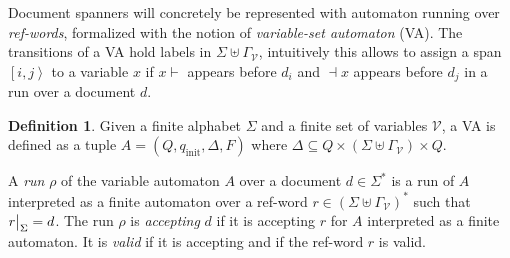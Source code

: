 \documentclass[12px]{article}
\theoremstyle{definition}
\newtheorem{definition}{Definition}
\newcommand{\Span}[1]{\left[ #1 \right\rangle}
\newcommand\restr[2]{{%
  \left.\kern-\nulldelimiterspace %
  #1 %
  \vphantom{\big|} %
  \right|_{#2} %
  }}
\begin{document}

        Document spanners will concretely be represented with automaton running
        over \textit{ref-words}, formalized with the notion of
        \textit{variable-set automaton} (VA). The transitions of a VA hold
        labels in $\Sigma \uplus \Gamma_\mathcal{V}$, intuitively this allows
        to assign a span $\Span{i, j}$ to a variable $x$ if $x{\vdash}$ appears
        before $d_i$ and ${\dashv}x$ appears before $d_j$ in a run over a
        document $d$.

        \begin{definition}
          Given a finite alphabet $\Sigma$ and a finite set of variables
          $\mathcal{V}$, a VA is defined as a tuple $A = (Q, q_\text{init},
          \Delta, F)$ where $\Delta \subseteq Q \times (\Sigma \uplus
          \Gamma_\mathcal{V}) \times Q$.


          A \textit{run} $\rho$ of the variable automaton $A$ over a document
          $d \in \Sigma^*$ is a run of $A$ interpreted as a finite automaton
          over a ref-word $r \in {(\Sigma \uplus \Gamma_\mathcal{V})}^*$ such
          that $\restr{r}{\Sigma} = d$. The run $\rho$ is \textit{accepting}
          $d$ if it is accepting $r$ for $A$ interpreted as a finite automaton.
          It is \textit{valid} if it is accepting and if the ref-word $r$ is
          valid.
        \end{definition}

\end{document}
